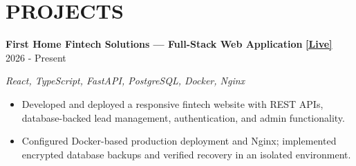 \section*{PROJECTS}

\textbf{First Home Fintech Solutions --- Full-Stack Web Application} \href{https://firsthomefintech.ae}{\textbf{ [Live]}}
\hfill 2026 - Present

\textit{React, TypeScript, FastAPI, PostgreSQL, Docker, Nginx}

\begin{itemize}
\item Developed and deployed a responsive fintech website with REST APIs, database-backed lead management, authentication, and admin functionality.
\item Configured Docker-based production deployment and Nginx; implemented encrypted database backups and verified recovery in an isolated environment.
\end{itemize}
